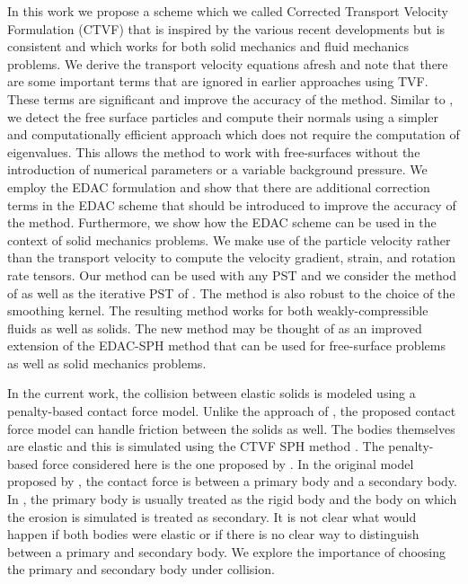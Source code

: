 In this work we propose a scheme which we called Corrected Transport Velocity
Formulation (CTVF) that is inspired by the various recent developments but is
consistent and which works for both solid mechanics and fluid mechanics
problems. We derive the transport velocity equations afresh and note that
there are some important terms that are ignored in earlier approaches using
TVF. These terms are significant and improve the accuracy of the method.
Similar to \cite{oger_ale_sph_2016,sun_consistent_2019}, we detect the free
surface particles and compute their normals using a simpler and
computationally efficient approach which does not require the computation of
eigenvalues. This allows the method to work with free-surfaces without the
introduction of numerical parameters or a variable background pressure. We
employ the EDAC formulation and show that there are additional correction
terms in the EDAC scheme that should be introduced to improve the accuracy of
the method. Furthermore, we show how the EDAC scheme can be used in the
context of solid mechanics problems. We make use of the particle velocity
rather than the transport velocity to compute the velocity gradient, strain,
and rotation rate tensors. Our method can be used with any PST and we consider
the method of \citet{sun_consistent_2019} as well as the iterative PST of
\citet{huang_kernel_2019}. The method is also robust to the choice of the
smoothing kernel. The resulting method works for both weakly-compressible
fluids as well as solids. The new method may be thought of as an improved
extension of the EDAC-SPH method that can be used for free-surface problems as
well as solid mechanics problems.


In the current work, the collision between elastic solids is modeled using a
penalty-based contact force model. Unlike the approach of
\cite{yan2021simulation}, the proposed contact force model can handle friction
between the solids as well. The bodies themselves are elastic and this is
simulated using the CTVF SPH method \cite{adepu2021corrected}. The penalty-based
force considered here is the one proposed by \citet{mohseni2021particle}. In the
original model proposed by \cite{mohseni2021particle}, the contact force is
between a primary body and a secondary body. In \cite{mohseni2021particle}, the
primary body is usually treated as the rigid body and the body on which the
erosion is simulated is treated as secondary. It is not clear what would happen
if both bodies were elastic or if there is no clear way to distinguish between a
primary and secondary body. We explore the importance of choosing the primary
and secondary body under collision.


